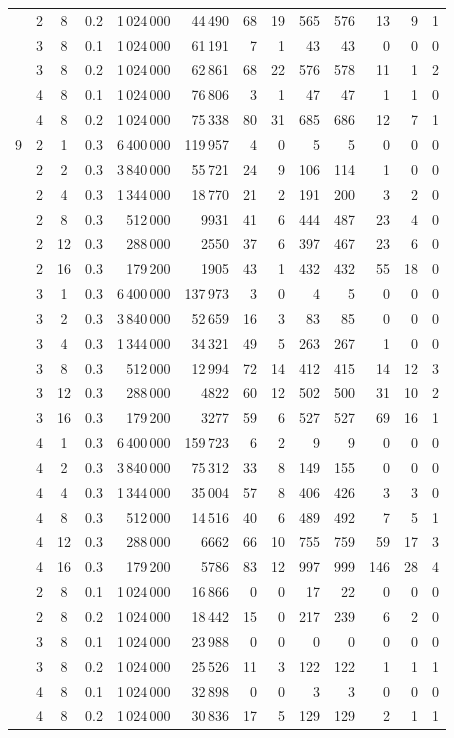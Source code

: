 \begin{tabular}{@{}ccccrrrrrrrrr@{}}
 & 2 & 8 & 0.2 & 1\,024\,000 & 44\,490 & 68 & 19 & 565 & 576 & 13 & 9 & 1 \\
 & 3 & 8 & 0.1 & 1\,024\,000 & 61\,191 & 7 & 1 & 43 & 43 & 0 & 0 & 0 \\
 & 3 & 8 & 0.2 & 1\,024\,000 & 62\,861 & 68 & 22 & 576 & 578 & 11 & 1 & 2 \\
 & 4 & 8 & 0.1 & 1\,024\,000 & 76\,806 & 3 & 1 & 47 & 47 & 1 & 1 & 0 \\
 & 4 & 8 & 0.2 & 1\,024\,000 & 75\,338 & 80 & 31 & 685 & 686 & 12 & 7 & 1 \\
\midrule
9 & 2 & 1 & 0.3 & 6\,400\,000 & 119\,957 & 4 & 0 & 5 & 5 & 0 & 0 & 0 \\
 & 2 & 2 & 0.3 & 3\,840\,000 & 55\,721 & 24 & 9 & 106 & 114 & 1 & 0 & 0 \\
 & 2 & 4 & 0.3 & 1\,344\,000 & 18\,770 & 21 & 2 & 191 & 200 & 3 & 2 & 0 \\
 & 2 & 8 & 0.3 & 512\,000 & 9931 & 41 & 6 & 444 & 487 & 23 & 4 & 0 \\
 & 2 & 12 & 0.3 & 288\,000 & 2550 & 37 & 6 & 397 & 467 & 23 & 6 & 0 \\
 & 2 & 16 & 0.3 & 179\,200 & 1905 & 43 & 1 & 432 & 432 & 55 & 18 & 0 \\
 & 3 & 1 & 0.3 & 6\,400\,000 & 137\,973 & 3 & 0 & 4 & 5 & 0 & 0 & 0 \\
 & 3 & 2 & 0.3 & 3\,840\,000 & 52\,659 & 16 & 3 & 83 & 85 & 0 & 0 & 0 \\
 & 3 & 4 & 0.3 & 1\,344\,000 & 34\,321 & 49 & 5 & 263 & 267 & 1 & 0 & 0 \\
 & 3 & 8 & 0.3 & 512\,000 & 12\,994 & 72 & 14 & 412 & 415 & 14 & 12 & 3 \\
 & 3 & 12 & 0.3 & 288\,000 & 4822 & 60 & 12 & 502 & 500 & 31 & 10 & 2 \\
 & 3 & 16 & 0.3 & 179\,200 & 3277 & 59 & 6 & 527 & 527 & 69 & 16 & 1 \\
 & 4 & 1 & 0.3 & 6\,400\,000 & 159\,723 & 6 & 2 & 9 & 9 & 0 & 0 & 0 \\
 & 4 & 2 & 0.3 & 3\,840\,000 & 75\,312 & 33 & 8 & 149 & 155 & 0 & 0 & 0 \\
 & 4 & 4 & 0.3 & 1\,344\,000 & 35\,004 & 57 & 8 & 406 & 426 & 3 & 3 & 0 \\
 & 4 & 8 & 0.3 & 512\,000 & 14\,516 & 40 & 6 & 489 & 492 & 7 & 5 & 1 \\
 & 4 & 12 & 0.3 & 288\,000 & 6662 & 66 & 10 & 755 & 759 & 59 & 17 & 3 \\
 & 4 & 16 & 0.3 & 179\,200 & 5786 & 83 & 12 & 997 & 999 & 146 & 28 & 4 \\
 & 2 & 8 & 0.1 & 1\,024\,000 & 16\,866 & 0 & 0 & 17 & 22 & 0 & 0 & 0 \\
 & 2 & 8 & 0.2 & 1\,024\,000 & 18\,442 & 15 & 0 & 217 & 239 & 6 & 2 & 0 \\
 & 3 & 8 & 0.1 & 1\,024\,000 & 23\,988 & 0 & 0 & 0 & 0 & 0 & 0 & 0 \\
 & 3 & 8 & 0.2 & 1\,024\,000 & 25\,526 & 11 & 3 & 122 & 122 & 1 & 1 & 1 \\
 & 4 & 8 & 0.1 & 1\,024\,000 & 32\,898 & 0 & 0 & 3 & 3 & 0 & 0 & 0 \\
 & 4 & 8 & 0.2 & 1\,024\,000 & 30\,836 & 17 & 5 & 129 & 129 & 2 & 1 & 1 \\
\bottomrule
\end{tabular}
